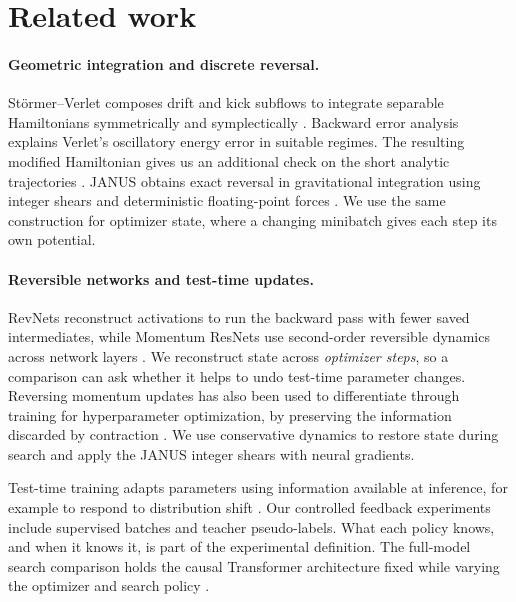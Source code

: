\section{Related work}
\label{sec:related}

\paragraph{Geometric integration and discrete reversal.}
St\"ormer--Verlet composes drift and kick subflows to integrate separable
Hamiltonians symmetrically and symplectically
\citep{verlet1967,hairer2006geometric}. Backward error analysis explains
Verlet's oscillatory energy error in suitable regimes. The resulting
modified Hamiltonian gives us an additional check on the short analytic
trajectories \citep{hairer2009energy}. JANUS obtains exact reversal in
gravitational integration using integer shears and deterministic
floating-point forces \citep{rein2018janus}. We use the same construction
for optimizer state, where a changing minibatch gives each step its own
potential.

\paragraph{Reversible networks and test-time updates.}
RevNets reconstruct activations to run the backward pass with fewer saved
intermediates, while Momentum ResNets use second-order reversible dynamics
across network layers \citep{gomez2017reversible,saulerichard2021momentum}.
We reconstruct state across \emph{optimizer steps}, so a comparison can
ask whether it helps to undo test-time parameter changes. Reversing
momentum updates has also been used to differentiate through training for
hyperparameter optimization, by preserving the information discarded
by contraction \citep{maclaurin2015reversible}. We use conservative
dynamics to restore state during search and apply the JANUS integer
shears with neural gradients.

Test-time training adapts parameters using information available at
inference, for example to respond to distribution shift
\citep{sun2020test}. Our controlled feedback experiments include
supervised batches and teacher pseudo-labels. What each policy knows,
and when it knows it, is part of the experimental definition. The
full-model search comparison holds the causal Transformer architecture
fixed while varying the optimizer and search policy
\citep{vaswani2017attention}.

